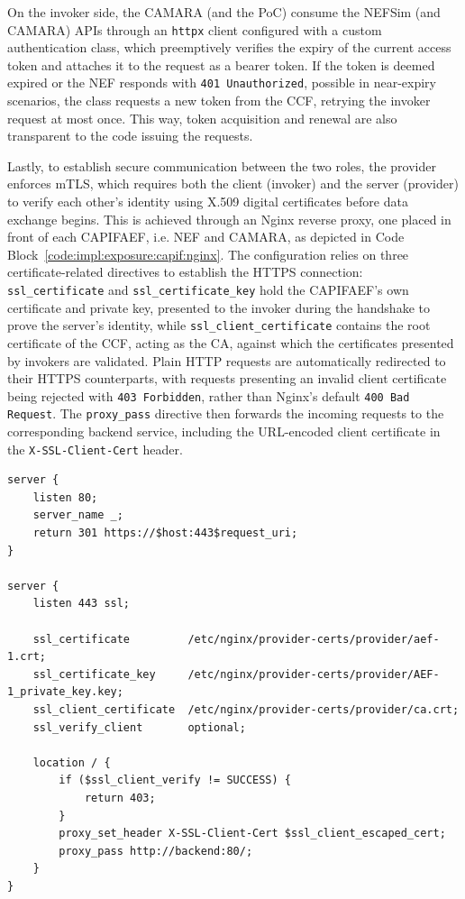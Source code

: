 On the invoker side, the CAMARA (and the \acs{PoC}) consume the \acs{NEF}Sim (and CAMARA) \acsp{API} through an \texttt{httpx} client configured with a custom authentication class, which preemptively verifies the expiry of the current access token and attaches it to the request as a bearer token. If the token is deemed expired or the \acs{NEF} responds with \texttt{401 Unauthorized}, possible in near-expiry scenarios, the class requests a new token from the \acs{CCF}, retrying the invoker request at most once. This way, token acquisition and renewal are also transparent to the code issuing the requests.

Lastly, to establish secure communication between the two roles, the provider enforces \acs{mTLS}, which requires both the client (invoker) and the server (provider) to verify each other's identity using X.509 digital certificates before data exchange begins. This is achieved through an Nginx reverse proxy, one placed in front of each \acs{CAPIFAEF}, i.e. \acs{NEF} and CAMARA, as depicted in Code Block~\ref{code:impl:exposure:capif:nginx}. The configuration relies on three certificate-related directives to establish the \acs{HTTPS} connection: \texttt{ssl\_certificate} and \texttt{ssl\_certificate\_key} hold the \acs{CAPIFAEF}’s own certificate and private key, presented to the invoker during the handshake to prove the server's identity, while \texttt{ssl\_client\_certificate} contains the root certificate of the \acs{CCF}, acting as the \ac{CA}, against which the certificates presented by invokers are validated. Plain \acs{HTTP} requests are automatically redirected to their \acs{HTTPS} counterparts, with requests presenting an invalid client certificate being rejected with \texttt{403 Forbidden}, rather than Nginx's default \texttt{400 Bad Request}. The \texttt{proxy\_pass} directive then forwards the incoming requests to the corresponding backend service, including the \acs{URL}-encoded client certificate in the \texttt{X-SSL-Client-Cert} header.

\begin{listing}[htbp]
\begin{verbatim}
server {
    listen 80;
    server_name _;
    return 301 https://$host:443$request_uri;
}

server {
    listen 443 ssl;

    ssl_certificate         /etc/nginx/provider-certs/provider/aef-1.crt;
    ssl_certificate_key     /etc/nginx/provider-certs/provider/AEF-1_private_key.key;
    ssl_client_certificate  /etc/nginx/provider-certs/provider/ca.crt;
    ssl_verify_client       optional;

    location / {
        if ($ssl_client_verify != SUCCESS) {
            return 403;
        }
        proxy_set_header X-SSL-Client-Cert $ssl_client_escaped_cert;
        proxy_pass http://backend:80/;
    }
}
\end{verbatim}
\caption{Nginx \acs{mTLS} Configuration for \acs{CAPIFAEF} reverse proxy}
\label{code:impl:exposure:capif:nginx}
\end{listing}

